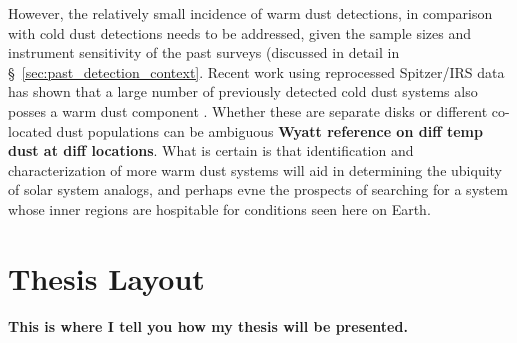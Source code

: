     However, the relatively small incidence of warm dust detections, in comparison with cold dust detections needs to be addressed, given the sample sizes and instrument sensitivity of the past surveys (discussed in detail in \S~\ref{sec:past_detection_context}. Recent work using reprocessed Spitzer/IRS data has shown that a large number of previously detected cold dust systems also posses a warm dust component \citep{Chen2014}. Whether these are separate disks or different co-located dust populations can be ambiguous \textbf{Wyatt reference on diff temp dust at diff locations}. What is certain is that identification and characterization of more warm dust systems will aid in determining the ubiquity of solar system analogs, and perhaps evne the prospects of searching for a system whose inner regions are hospitable for conditions seen here on Earth. 
    
    
\section{Thesis Layout}
    
    \textbf{This is where I tell you how my thesis will be presented.}
    

    